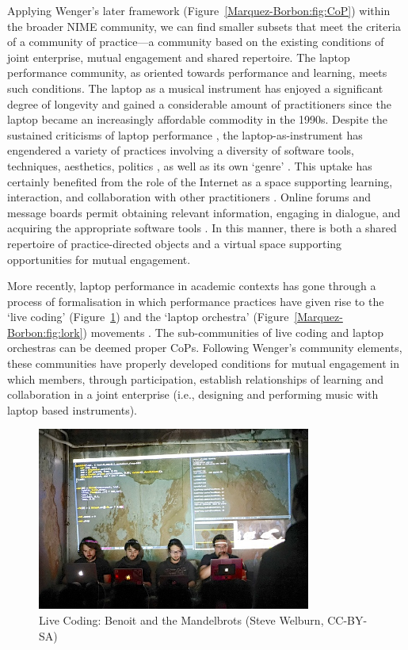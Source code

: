 Applying Wenger's later framework (Figure~\ref{Marquez-Borbon:fig:CoP}) within the broader NIME community, we can find smaller subsets that meet the criteria of a community of practice---a community based on the existing conditions of joint enterprise, mutual engagement and shared repertoire. The laptop performance community, as oriented towards performance and learning, meets such conditions. The laptop as a musical instrument has enjoyed a significant degree of longevity and gained a considerable amount of practitioners since the laptop became an increasingly affordable commodity in the 1990s. Despite the sustained criticisms of laptop performance \cite{Ostertag:2002,Richards:2008,Schloss:2003,Stuart:2003}, the laptop-as-instrument \cite{Magnusson:2010} has engendered a variety of practices involving a diversity of software tools, techniques, aesthetics, politics \cite{Grossmann:2008,Monroe:2003,Stuart:2003,Turner:2003}, as well as its own `genre' \cite{Cascone:2003}. This uptake has certainly benefited from the role of the Internet as a space supporting learning, interaction, and collaboration with other practitioners \cite{Cascone:2000}. Online forums and message boards permit obtaining relevant information, engaging in dialogue, and acquiring the appropriate software tools \cite{Cascone:2000}. In this manner, there is both a shared repertoire of practice-directed objects and a virtual space supporting opportunities for mutual engagement. 

More recently, laptop performance in academic contexts has gone through a process of formalisation in which performance practices have given rise to the `live coding' (Figure~\ref{Marquez-Borbon:fig:livecoding}) \cite{Collins:2003,Collins:2011,Magnusson:2011,Wang:2004,Ward:2004} and the `laptop orchestra' (Figure~\ref{Marquez-Borbon:fig:lork}) movements \cite{Fiebrink:2007,Trueman:2007,Wang:2008a}. The sub-communities of live coding and laptop orchestras can be deemed proper CoPs. Following Wenger's community elements, these communities have properly developed conditions for mutual engagement in which members, through participation, establish relationships of learning and collaboration in a joint enterprise (i.e., designing and performing music with laptop based instruments). 

\begin{figure}[t]
	\centering
		\includegraphics[width=9cm]{livecoding.jpg}
	\caption{Live Coding: Benoit and the Mandelbrots (Steve Welburn, CC-BY-SA)}
	\label{Marquez-Borbon:fig:livecoding}
\end{figure}

